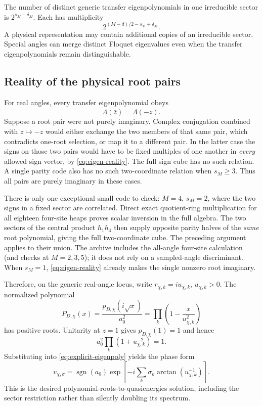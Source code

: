 \documentclass[10pt,letterpaper]{article}
\begin{document}
The number of distinct generic transfer eigenpolynomials in one irreducible sector is $2^{s_M-\delta_M}$. Each has multiplicity
\begin{equation}\label{eq:sector-multiplicity}
 2^{(M-d)/2-s_M+\delta_M}.
\end{equation}
A physical representation may contain additional copies of an irreducible sector. Special angles can merge distinct Floquet eigenvalues even when the transfer eigenpolynomials remain distinguishable.

\subsection{Reality of the physical root pairs}
For real angles, every transfer eigenpolynomial obeys
\begin{equation}\label{eq:eigen-reality}
 \overline{\Lambda(\bar z)}=\Lambda(-z).
\end{equation}
Suppose a root pair were not purely imaginary. Complex conjugation combined with $z\mapsto-z$ would either exchange the two members of that same pair, which contradicts one-root selection, or map it to a different pair. In the latter case the signs on those two pairs would have to be fixed multiples of one another in \emph{every} allowed sign vector, by \eqref{eq:eigen-reality}. The full sign cube has no such relation. A single parity code also has no such two-coordinate relation when $s_M\ge3$. Thus all pairs are purely imaginary in these cases.

There is only one exceptional small code to check: $M=4$, $s_M=2$, where the two signs in a fixed sector are correlated. Direct exact quotient-ring multiplication for all eighteen four-site heaps proves scalar inversion in the full algebra. The two sectors of the central product $h_1h_4$ then supply opposite parity halves of the \emph{same} root polynomial, giving the full two-coordinate cube. The preceding argument applies to their union. The archive includes the all-angle four-site calculation (and checks at $M=2,3,5$); it does not rely on a sampled-angle discriminant. When $s_M=1$, \eqref{eq:eigen-reality} already makes the single nonzero root imaginary.

Therefore, on the generic real-angle locus, write $r_{\chi,k}=iu_{\chi,k}$, $u_{\chi,k}>0$. The normalized polynomial
\begin{equation}\label{eq:mode-poly-correct}
 P_{D,\chi}(x)=\frac{p_{D,\chi}(i\sqrt{x})}{a_0^2}
 =\prod_k\left(1-\frac{x}{u_{\chi,k}^2}\right)
\end{equation}
has positive roots. Unitarity at $z=1$ gives $p_{D,\chi}(1)=1$ and hence
\begin{equation}\label{eq:unitnorm}
 a_0^2\prod_k(1+u_{\chi,k}^{-2})=1.
\end{equation}
Substituting into \eqref{eq:explicit-eigenpoly} yields the phase form
\begin{equation}\label{eq:physicalphases}
 v_{\chi,\sigma}=\operatorname{sgn}(a_0)
 \exp\!\left[-i\sum_k\sigma_k\arctan(u_{\chi,k}^{-1})\right].
\end{equation}
This is the desired polynomial-roots-to-quasienergies solution, including the sector restriction rather than silently doubling its spectrum.
\end{document}

